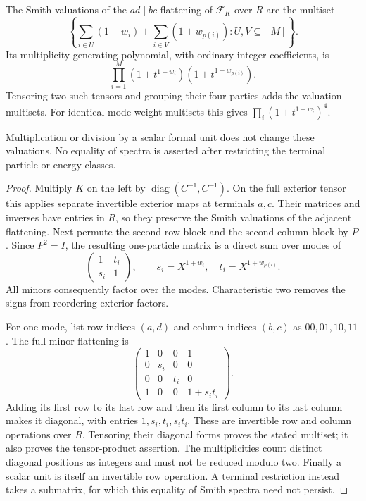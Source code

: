 \begin{proposition}
\label{prop:fock-smith-spectrum}
The Smith valuations of the $ad\mid bc$ flattening of $\mathcal F_K$
over $R$ are the multiset
\[
 \left\{\sum_{i\in U}(1+w_i)+
              \sum_{i\in V}(1+w_{p(i)}):
              U,V\subseteq[M]\right\}.
\]
Its multiplicity generating polynomial, with ordinary integer
coefficients, is
\[
 \prod_{i=1}^M(1+t^{1+w_i})(1+t^{1+w_{p(i)}}).
\]
Tensoring two such tensors and grouping their four parties adds
the valuation multisets. For identical mode-weight multisets this
gives $\prod_i(1+t^{1+w_i})^4$.

Multiplication or division by a scalar formal unit does not change
these valuations. No equality of spectra is asserted after
restricting the terminal particle or energy classes.
\end{proposition}
\begin{proof}
Multiply $K$ on the left by
$\operatorname{diag}(C^{-1},C^{-1})$. On the full exterior tensor
this applies separate invertible exterior maps at terminals $a,c$.
Their matrices and inverses have entries in $R$, so they preserve
the Smith valuations of the adjacent flattening. Next permute the
second row block and the second column block by $P$. Since
$P^2=I$, the resulting one-particle matrix is a direct sum over
modes of
\[
 \begin{pmatrix}1&t_i\\s_i&1\end{pmatrix},\qquad
 s_i=X^{1+w_i},\quad t_i=X^{1+w_{p(i)}}.
\]
All minors consequently factor over the modes. Characteristic two
removes the signs from reordering exterior factors.

For one mode, list row indices $(a,d)$ and column indices $(b,c)$
as $00,01,10,11$. The full-minor flattening is
\[
 \begin{pmatrix}
 1&0&0&1\\
 0&s_i&0&0\\
 0&0&t_i&0\\
 1&0&0&1+s_it_i
 \end{pmatrix}.
\]
Adding its first row to its last row and then its first column to
its last column makes it diagonal, with entries
$1,s_i,t_i,s_it_i$. These are invertible row and column operations
over $R$. Tensoring their diagonal forms proves the stated
multiset; it also proves the tensor-product assertion. The
multiplicities count distinct diagonal positions as integers and
must not be reduced modulo two. Finally a scalar unit is itself
an invertible row operation. A terminal restriction instead takes
a submatrix, for which this equality of Smith spectra need not
persist.
\end{proof}

